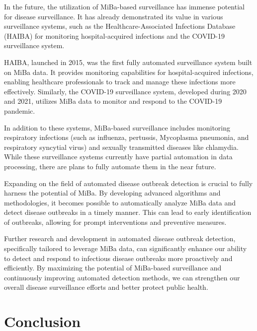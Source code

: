 \documentclass[a4paper,twoside,11pt]{report} %
\theoremstyle{definition}
\theoremstyle{definition}
\theoremstyle{definition}
\theoremstyle{definition}
\theoremstyle{remark}
\begin{document}
In the future, the utilization of MiBa-based surveillance has immense potential for disease surveillance. It has already demonstrated its value in various surveillance systems, such as the Healthcare-Associated Infections Database (HAIBA) for monitoring hospital-acquired infections and the COVID-19 surveillance system.

HAIBA, launched in 2015, was the first fully automated surveillance system built on MiBa data. It provides monitoring capabilities for hospital-acquired infections, enabling healthcare professionals to track and manage these infections more effectively. Similarly, the COVID-19 surveillance system, developed during 2020 and 2021, utilizes MiBa data to monitor and respond to the COVID-19 pandemic.

In addition to these systems, MiBa-based surveillance includes monitoring respiratory infections (such as influenza, pertussis, Mycoplasma pneumonia, and respiratory syncytial virus) and sexually transmitted diseases like chlamydia. While these surveillance systems currently have partial automation in data processing, there are plans to fully automate them in the near future.

Expanding on the field of automated disease outbreak detection is crucial to fully harness the potential of MiBa. By developing advanced algorithms and methodologies, it becomes possible to automatically analyze MiBa data and detect disease outbreaks in a timely manner. This can lead to early identification of outbreaks, allowing for prompt interventions and preventive measures.

Further research and development in automated disease outbreak detection, specifically tailored to leverage MiBa data, can significantly enhance our ability to detect and respond to infectious disease outbreaks more proactively and efficiently. By maximizing the potential of MiBa-based surveillance and continuously improving automated detection methods, we can strengthen our overall disease surveillance efforts and better protect public health.

\cleardoublepage

\chapter{Conclusion}

\blindtext

\cleardoublepage

\printbibliography[heading=bibintoc,title={Bibliography}]
\cleardoublepage 
\appendix
\end{document}
